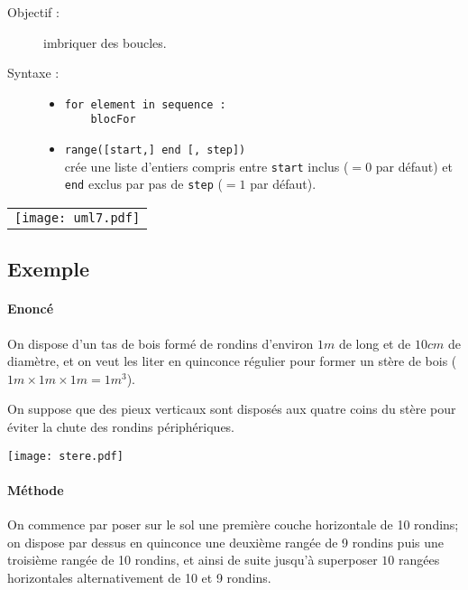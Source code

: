 \noindent\begin{minipage}{7cm}
\begin{description}
\item[Objectif :] imbriquer des boucles.
\item[Syntaxe \python :] \mbox{}
\begin{itemize}
\item \texttt{for element in sequence : \\ \mbox{}\ \ \ \ blocFor}

\item \texttt{range([start,] end [, step])}\\ crée une liste d'entiers compris 
entre \texttt{\tt start} inclus
($= 0$ par défaut) et \texttt{end} exclus par pas de \texttt{step} ($= 1$ par défaut).
\end{itemize}
\end{description}
\end{minipage}
\mbox{}\hfill
\begin{tabular}{c}
\texttt{[image: uml7.pdf]}\\
\end{tabular}

\subsection{Exemple}

\paragraph{Enoncé} On dispose d'un tas de bois formé de rondins d'environ $1 m$ de long et
de $10 cm$ de diamètre, et on veut les liter en quinconce régulier pour former un stère 
de bois ($1m\times 1m\times 1m = 1 m^3$). 

\noindent\begin{minipage}{9cm}
On suppose que des pieux verticaux sont disposés aux quatre coins du stère pour éviter la chute des rondins périphériques.
\end{minipage}
\hfill
\begin{minipage}{3cm}
\texttt{[image: stere.pdf]}
\end{minipage}

\paragraph{Méthode} On commence par poser sur le sol une première couche horizontale
de 10 rondins; on dispose par dessus en quinconce une deuxième rangée de 9 rondins puis
une troisième rangée de 10 rondins, et ainsi de suite jusqu'à superposer
$10$ rangées horizontales alternativement de 10 et 9 rondins.

